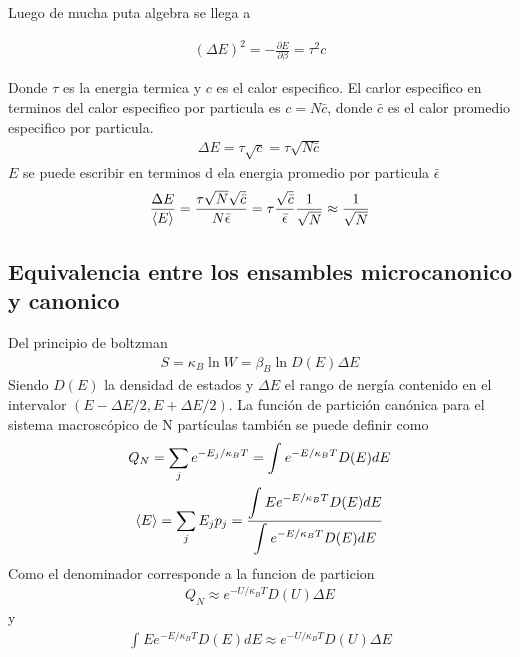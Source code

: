 \documentclass{article}
\newcommand{\caja}[3]{%
  \begin{tcolorbox}[colback=#1!5!white,colframe=#1!25!black,title=#2]
    #3
  \end{tcolorbox}%
}
\begin{document}
Luego de mucha puta algebra se llega a 
\caja{green}{}{
  \begin{gather*}
    (\Delta E )^2 = - \frac{\partial E  }{\partial \beta} = \tau^2 c  
  \end{gather*}
}
Donde $ \tau $ es la energia termica y $ c  $ es el calor especifico. El carlor especifico en terminos del calor especifico por particula es $ c = N \bar c  $, donde $ \bar c  $ es el calor promedio especifico por particula.
\begin{gather*}
  \Delta E = \tau \sqrt{c }  = \tau \sqrt{N\bar c }  
\end{gather*}
$ E  $ se puede escribir en terminos d ela energia promedio por particula $ \bar \epsilon  $ 
\begin{gather*}
  \frac{\Delta E }{\expval{E }} = \frac{\tau \sqrt{N } \sqrt{\bar c } }{N \bar \epsilon} = \tau \frac{\sqrt{\bar c } }{\bar \epsilon} \frac{1}{\sqrt{N } } \approx \frac{1}{\sqrt{N } } 
\end{gather*}

\subsection{Equivalencia entre los ensambles microcanonico y canonico }
Del principio de boltzman 
\begin{gather*}
  S = \kappa_B \ln{W } = \beta_B \ln{D(E)\Delta E }
\end{gather*}
Siendo $ D(E)  $ la densidad de estados y $ \Delta E  $ el rango de nergía contenido en el intervalor $ (E - \Delta E/2 , E + \Delta E/2 ) $. La función de partición canónica para el sistema macroscópico de N partículas también se puede definir como 
\begin{gather*}
  Q_N = \displaystyle\sum_{j }^{} e ^ {- E_j /\kappa_B T } = \displaystyle\int_{}^{} e ^ {- E/\kappa_B T }D(E) dE \\
  \expval{E } = \displaystyle\sum_{j }^{} E_j p_j = \frac{\displaystyle\int_{}^{} Ee ^ {- E/\kappa_B T }D(E) dE}{\displaystyle\int_{}^{} e ^ {- E/\kappa_B T }D(E) dE}
\end{gather*}
Como el denominador corresponde a la funcion de particion 
\begin{gather*}
  Q_N \approx e ^ {- U /\kappa_B T }D(U) \Delta E  
\end{gather*}
y 
\begin{gather*}
   \displaystyle\int_{}^{} Ee ^ {- E/\kappa_B T }D(E) dE \approx e ^ {- U /\kappa_B T }D(U) \Delta E
\end{gather*}
\end{document}
